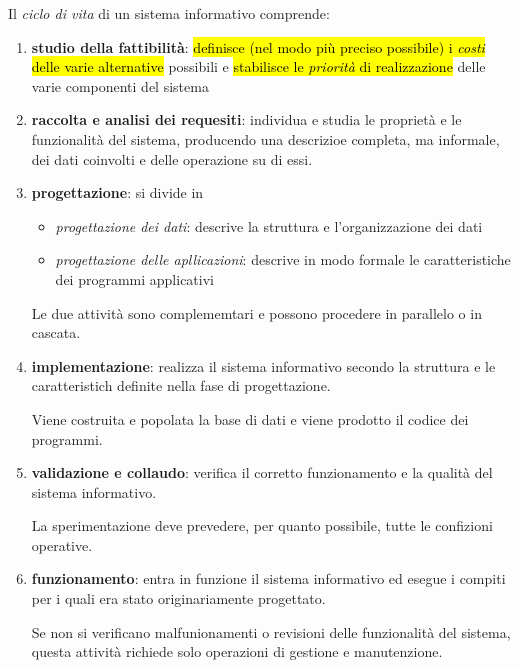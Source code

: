 \documentclass[a4paper, 12pt]{book}
\begin{document}
    Il \textit{ciclo di vita} di un sistema informativo comprende:
    \begin{enumerate}
      \item \textbf{studio della fattibilità}: \hl{definisce (nel modo più preciso possibile) i \textit{costi} delle varie alternative} possibili e \hl{stabilisce le \textit{priorità} di realizzazione} delle varie componenti del sistema
      \item \textbf{raccolta e analisi dei requesiti}: individua e studia le proprietà e le funzionalità del sistema, producendo una descrizioe completa, ma informale, dei dati coinvolti e delle operazione su di essi.
      \item \textbf{progettazione}: si divide in
      \begin{itemize}
        \item \textit{progettazione dei dati}: descrive la struttura e l'organizzazione dei dati
        \item \textit{progettazione delle apllicazioni}: descrive in modo formale le caratteristiche dei programmi applicativi
      \end{itemize}

      Le due attività sono complememtari e possono procedere in parallelo o in cascata.

      \item \textbf{implementazione}: realizza il sistema informativo secondo la struttura e le caratteristich definite nella fase di progettazione.
      
      Viene costruita e popolata la base di dati e viene prodotto il codice dei programmi.

      \item \textbf{validazione e collaudo}: verifica il corretto funzionamento e la qualità del sistema informativo.
      
      La sperimentazione deve prevedere, per quanto possibile, tutte le confizioni operative.

      \item \textbf{funzionamento}: entra in funzione il sistema informativo ed esegue i compiti per i quali era stato originariamente progettato.
      
      Se non si verificano malfunionamenti o revisioni delle funzionalità del sistema, questa attività richiede solo operazioni di gestione e manutenzione.
    \end{enumerate}
\end{document}
